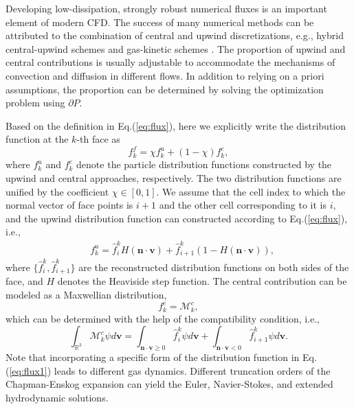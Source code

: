 \documentclass[preprint,3p,12pt,sort&compress]{elsarticle}
\begin{document}
Developing low-dissipation, strongly robust numerical fluxes is an important element of modern CFD.
The success of many numerical methods can be attributed to the combination of central and upwind discretizations, e.g., hybrid central-upwind schemes \cite{evje2005hybrid,kurganov2007reduction} and gas-kinetic schemes \cite{xu2014direct,sun2015explicit}.
The proportion of upwind and central contributions is usually adjustable to accommodate the mechanisms of convection and diffusion in different flows.
In addition to relying on a priori assumptions, the proportion can be determined by solving the optimization problem using $\partial P$.

Based on the definition in Eq.(\ref{eq:flux}), here we explicitly write the distribution function at the $k$-th face as 
\begin{equation}
    f_k^f = \chi f_{k}^u + (1-\chi) f_{k}^c,
\end{equation}
where $f_k^u$ and $f_k^c$ denote the particle distribution functions constructed by the upwind and central approaches, respectively.
The two distribution functions are unified by the coefficient $\chi \in [0,1]$.
We assume that the cell index to which the normal vector of face points is $i+1$ and the other cell corresponding to it is $i$, and the upwind distribution function can constructed according to Eq.(\ref{eq:flux}), i.e.,
\begin{equation}
\begin{aligned}
    &f_{k}^u = \hat f_{i}^k H(\mathbf n \cdot \mathbf v) + \hat f_{i+1}^k (1-H(\mathbf n \cdot \mathbf v)),
\end{aligned}
\label{eq:flux1}
\end{equation}
where $\{\hat f_{i}^k,\hat f_{i+1}^k\}$ are the reconstructed distribution functions on both sides of the face, and $H$ denotes the Heaviside step function.
The central contribution can be modeled as a Maxwellian distribution,
\begin{equation}
    f_{k}^c = \mathcal M_k^c,
\end{equation}
which can be determined with the help of the compatibility condition, i.e.,
\begin{equation}
    \int_{\mathbb R^3} \mathcal M_{k}^c \psi d\mathbf v = \int_{\mathbf n \cdot \mathbf v \ge 0} \hat f_i^k \psi d\mathbf v+ \int_{\mathbf n \cdot \mathbf v <0} \hat f_{i+1}^k \psi d\mathbf v.
\end{equation}
Note that incorporating a specific form of the distribution function in Eq.(\ref{eq:flux1}) leads to different gas dynamics.
Different truncation orders of the Chapman-Enskog expansion can yield the Euler, Navier-Stokes, and extended hydrodynamic solutions.
\end{document}
